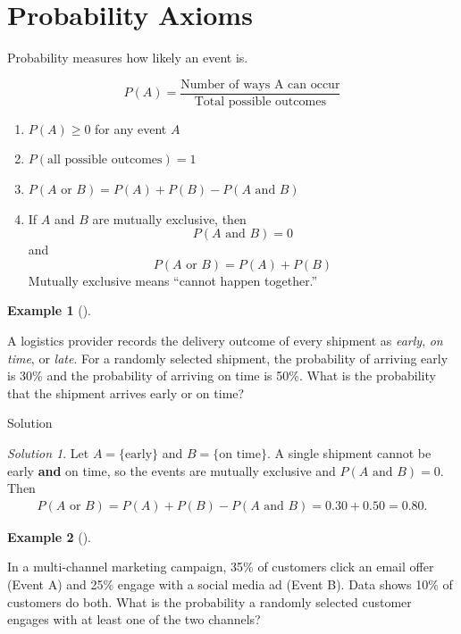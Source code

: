 \documentclass[
  12pt,
  letterpaper,
]{scrbook}
\providecommand{\tightlist}{%
  \setlength{\itemsep}{0pt}\setlength{\parskip}{0pt}}
\renewcommand{\tightlist}{\setlength{\itemsep}{0.5\baselineskip}\setlength{\parskip}{0.2\baselineskip}}
\theoremstyle{plain}
\theoremstyle{definition}
\newtheorem{example}{Example}[chapter]
\theoremstyle{remark}
\newtheorem{refsolution}{Solution}[chapter]
\begin{document}
\section{Probability Axioms}\label{probability-axioms}

Probability measures how likely an event is.

\[P(A) = \frac{\text{Number of ways A can occur}}{\text{Total possible outcomes}}\]

\begin{enumerate}
\def\labelenumi{\arabic{enumi}.}
\tightlist
\item
  \(P(A) \geq 0\) for any event \(A\)
\item
  \(P(\text{all possible outcomes}) = 1\)
\item
  \(P(A \text{ or } B) = P(A) + P(B) - P(A\text{ and }B)\)
\item
  If \(A\) and \(B\) are mutually exclusive, then \[
  P(A \text{ and } B) = 0
  \] and \[
  P(A \text{ or } B) = P(A) + P(B)
  \] Mutually exclusive means ``cannot happen together.''
\end{enumerate}

\begin{example}[]\protect\hypertarget{exm-1}{}\label{exm-1}

A logistics provider records the delivery outcome of every shipment as
\emph{early}, \emph{on time}, or \emph{late}. For a randomly selected
shipment, the probability of arriving early is 30\% and the probability
of arriving on time is 50\%. What is the probability that the shipment
arrives early or on time?

\end{example}

Solution

\begin{refsolution}
Let \(A=\{\text{early}\}\) and \(B=\{\text{on time}\}.\) A single
shipment cannot be early \textbf{and} on time, so the events are
mutually exclusive and \(P(A \text{ and } B)=0.\) Then \[
\begin{split}
P(A \text{ or } B) = P(A)+P(B)-P(A \text{ and } B)=0.30+0.50=0.80.
\end{split}
\]

\label{sol-1}

\end{refsolution}

\begin{example}[]\protect\hypertarget{exm-2}{}\label{exm-2}

In a multi-channel marketing campaign, 35\% of customers click an email
offer (Event A) and 25\% engage with a social media ad (Event B). Data
shows 10\% of customers do both. What is the probability a randomly
selected customer engages with at least one of the two channels?

\end{example}
\end{document}
